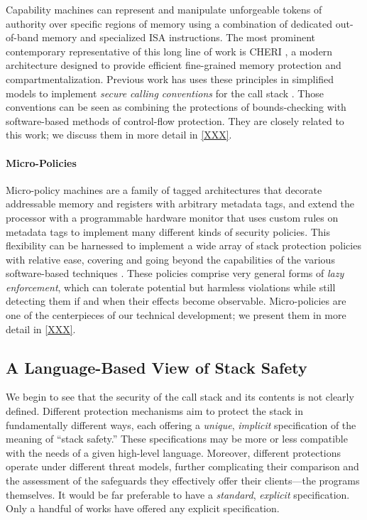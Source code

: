 %
Capability machines can represent and manipulate
unforgeable tokens of authority over specific regions of
memory using a combination of dedicated out-of-band memory and
specialized ISA instructions.
%
The most prominent contemporary representative of this long line of work is
CHERI \cite{}, a modern architecture designed to provide efficient fine-grained
memory protection and compartmentalization.
%
Previous work has uses these principles in simplified models to implement
\emph{secure calling conventions} for the call
stack \cite{}. Those conventions can be seen as combining the
protections of bounds-checking with software-based methods of control-flow protection.
%
They are closely related  to this work; we discuss them in more
detail in \cref{XXX}.
%

\paragraph{Micro-Policies}
%
%
Micro-policy machines are a family of tagged architectures that decorate
addressable memory and registers with arbitrary metadata tags, and extend the
processor with a programmable hardware monitor that uses custom rules on
metadata tags to implement many different kinds of security policies.
%
This flexibility can be harnessed to implement a wide array of stack protection policies with relative ease, covering and going beyond the capabilities  of the various software-based techniques \cite{} .
%
These policies comprise very general forms of \emph{lazy enforcement}, which can tolerate
potential but harmless violations  while still detecting them if and when their effects
become observable. 
%
Micro-policies are one of the centerpieces of our technical development; we
present them in more detail in \cref{XXX}.


\subsection{A Language-Based View of Stack Safety}

We begin to see that the security of the call stack and its contents is not
clearly defined. Different protection mechanisms aim to protect the stack
in fundamentally different ways, each offering a \emph{unique}, \emph{implicit}
specification of the meaning of ``stack safety.'' These specifications
may be more or less compatible with the needs of a given high-level language.
Moreover, different protections operate under different threat models, further
complicating their comparison and the assessment of the safeguards they
effectively offer their clients---the programs themselves.
It would be far preferable to have a \emph{standard}, \emph{explicit} specification.
Only a handful of works have offered any explicit specification.

